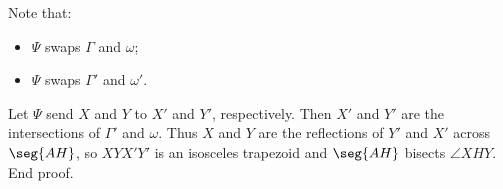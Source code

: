 Note that:
\begin{itemize}[itemsep=0em]
    \item $\Psi$ swaps $\Gamma$ and $\omega$;
    \item $\Psi$ swaps $\Gamma'$ and $\omega'$.
\end{itemize}
Let $\Psi$ send $X$ and $Y$ to $X'$ and $Y'$, respectively. Then $X'$ and $Y'$ are the intersections of $\Gamma'$ and $\omega$. Thus $X$ and $Y$ are the reflections of $Y'$ and $X'$ across $\seg{AH}$, so $XYX'Y'$ is an isosceles trapezoid and $\seg{AH}$ bisects $\angle XHY$. End proof.
